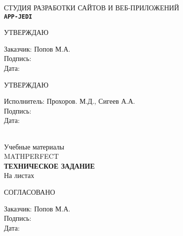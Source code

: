 %
\begin{center}
{\Large {{СТУДИЯ РАЗРАБОТКИ САЙТОВ И ВЕБ-ПРИЛОЖЕНИЙ \\ \texttt{\LARGE \bf APP-JEDI}}}}\\[1cm]

\begin{minipage}{\textwidth}
  \begin{minipage}{0.5\textwidth}
    \begin{flushleft}
      \begin{center}
        {\large УТВЕРЖДАЮ}\\
      \end{center}
      Заказчик: Попов М.А.\\
      Подпись:\\
      Дата:
    \end{flushleft}
  \end{minipage}
  \begin{minipage}{0.5\textwidth}
    \begin{flushleft}
      \begin{center}
        {\large УТВЕРЖДАЮ}\\
      \end{center}
      Исполнитель: Прохоров. М.Д., Сигеев А.А.\\
      Подпись:\\
      Дата:
    \end{flushleft}
  \end{minipage}
\end{minipage}
\\[4cm]
{\huge Учебные материалы} \\ %
{\LARGE MATHPERFECT } \\[0.5cm]
{ \Huge \bf ТЕХНИЧЕСКОЕ ЗАДАНИЕ }\\[1.5cm]

На \pageref{LastPage} листах\\[2cm]
\begin{flushleft}
\begin{minipage}{0.5\textwidth}
\begin{center}
  СОГЛАСОВАНО
\end{center}
    Заказчик: Попов М.А.\\
    Подпись:\\
    Дата:
\end{minipage}
\end{flushleft}
\end{center}
\thispagestyle{empty}
